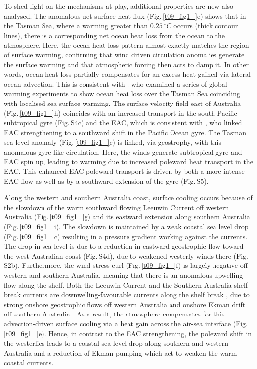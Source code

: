 \documentclass[draft,linenumbers]{agujournal2018}
\begin{document}
To shed light on the mechanisms at play, additional properties are now also analysed. The anomalous net surface heat flux (Fig.\,\ref{t09_fig1_}e) shows that in the Tasman Sea, where a warming greater than $0.25\ ^{\circ}C$ occurs (thick contour lines), there is a corresponding net ocean heat loss from the ocean to the atmosphere. Here, the ocean heat loss pattern almost exactly matches the region of surface warming, confirming that wind driven circulation anomalies generate the surface warming and that atmospheric forcing then acts to damp it. In other words, ocean heat loss partially compensates for an excess heat gained via lateral ocean advection. This is consistent with \citet{Cai2005}, who examined a series of global warming experiments to show ocean heat loss over the Tasman Sea coinciding with localised sea surface warming. The surface velocity field east of Australia (Fig.\,\ref{t09_fig1_}h) coincides with an increased transport in the south Pacific subtropical gyre (Fig.\,S4c) and the EAC, which is consistent with \citet{Hill2011}, who linked EAC strengthening to a southward shift in the Pacific Ocean gyre. The Tasman sea level anomaly (Fig.\,\ref{t09_fig1_}c) is linked, via geostrophy, with this anomalous gyre-like circulation. Here, the winds generate subtropical gyre and EAC spin up, leading to warming due to increased poleward heat transport in the EAC. This enhanced EAC poleward transport is driven by both a more intense EAC flow as well as by a southward extension of the gyre (Fig.\,S5).

Along the western and southern Australia coast, surface cooling occurs because of the slowdown of the warm southward flowing Leeuwin Current off western Australia (Fig.\,\ref{t09_fig1_}g) and its eastward extension along southern Australia (Fig.\,\ref{t09_fig1_}i). The slowdown is maintained by a weak coastal sea level drop (Fig.\,\ref{t09_fig1_}c) resulting in a pressure gradient working against the currents. The drop in sea-level is due to a reduction in eastward geostrophic flow toward the west Australian coast (Fig.\,S4d), due to weakened westerly winds there (Fig.\,S2b). Furthermore, the wind stress curl (Fig.\,\ref{t09_fig1_}f) is largely negative off western and southern Australia, meaning that there is an anomalous upwelling flow along the shelf. Both the Leeuwin Current and the Southern Australia shelf break currents are downwelling-favourable currents along the shelf break \citep{Furue2017,Middleton2007}, due to strong onshore geostrophic flows off western Australia \citep{Godfrey1985} and onshore Ekman drift off southern Australia \citep{Middleton2007}. As a result, the atmosphere compensates for this advection-driven surface cooling via a heat gain across the air-sea interface (Fig.\,\ref{t09_fig1_}e). Hence, in contrast to the EAC strengthening, the poleward shift in the westerlies leads to a coastal sea level drop along southern and western Australia and a reduction of Ekman pumping which act to weaken the warm coastal currents.
\end{document}
